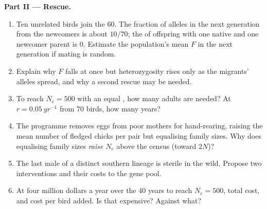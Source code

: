 \begin{problem}
\medskip
\noindent\textbf{Part II --- Rescue.}
\begin{enumerate}[resume]
  \item Ten unrelated birds join the 60. The fraction of alleles in the
        next generation from the newcomers is about $10/70$; the
         of offspring with one native and one
        newcomer parent is $0$. Estimate the population's mean $F$ in
        the next generation if mating is random.
  \item Explain why $F$ falls at once but heterozygosity rises only as
        the migrants' alleles spread, and why a second rescue may be
        needed.
  \item To reach $N_{e} = 500$ with an equal , how many adults
        are needed? At $r = \qty{0.05}{yr^{-1}}$ from 70 birds, how many
        years?
  \item The programme removes eggs from poor mothers for hand-rearing,
        raising the mean number of fledged chicks per pair but equalising
        family sizes. Why does equalising family sizes \emph{raise}
        $N_{e}$ above the census (toward $2N$)?
  \item The last male of a distinct southern lineage is sterile in the
        wild. Propose two interventions and their costs to the gene
        pool.
  \item At four million dollars a year over the 40 years to reach
        $N_{e} = 500$, total cost, and cost per bird added. Is that expensive? Against
        what?
\end{enumerate}


\end{problem}

